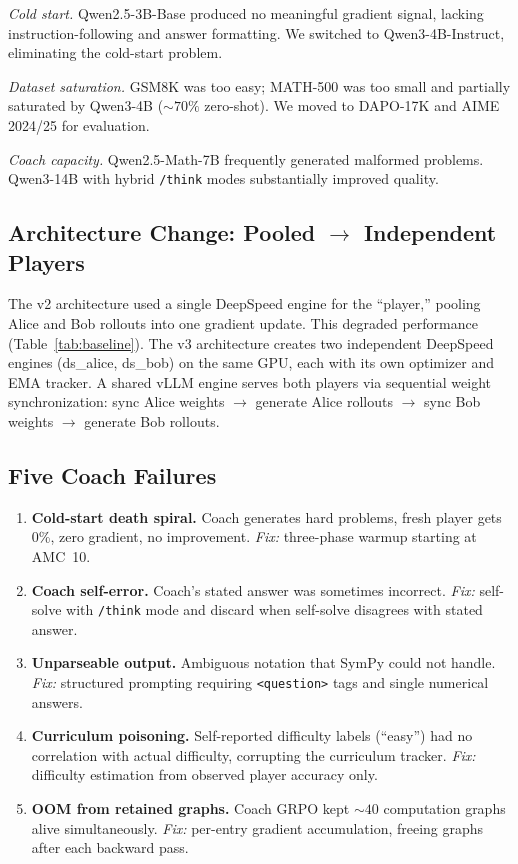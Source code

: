 \documentclass{article}
\begin{document}
\emph{Cold start.} Qwen2.5-3B-Base produced no meaningful gradient signal, lacking instruction-following and answer formatting. We switched to Qwen3-4B-Instruct, eliminating the cold-start problem.

\emph{Dataset saturation.} GSM8K was too easy; MATH-500 was too small and partially saturated by Qwen3-4B (${\sim}70\%$ zero-shot). We moved to DAPO-17K and AIME 2024/25 for evaluation.

\emph{Coach capacity.} Qwen2.5-Math-7B frequently generated malformed problems. Qwen3-14B with hybrid \texttt{/think} modes substantially improved quality.

\subsection{Architecture Change: Pooled $\rightarrow$ Independent Players}

The v2 architecture used a single DeepSpeed engine for the ``player,'' pooling Alice and Bob rollouts into one gradient update. This degraded performance (Table~\ref{tab:baseline}). The v3 architecture creates two independent DeepSpeed engines (ds\_alice, ds\_bob) on the same GPU, each with its own optimizer and EMA tracker. A shared vLLM engine serves both players via sequential weight synchronization: sync Alice weights $\rightarrow$ generate Alice rollouts $\rightarrow$ sync Bob weights $\rightarrow$ generate Bob rollouts.

\subsection{Five Coach Failures}

\begin{enumerate}[leftmargin=*,itemsep=1pt]
    \item \textbf{Cold-start death spiral.} Coach generates hard problems, fresh player gets 0\%, zero gradient, no improvement. \emph{Fix:} three-phase warmup starting at AMC~10.

    \item \textbf{Coach self-error.} Coach's stated answer was sometimes incorrect. \emph{Fix:} self-solve with \texttt{/think} mode and discard when self-solve disagrees with stated answer.

    \item \textbf{Unparseable output.} Ambiguous notation that SymPy could not handle. \emph{Fix:} structured prompting requiring \texttt{<question>} tags and single numerical answers.

    \item \textbf{Curriculum poisoning.} Self-reported difficulty labels (``easy'') had no correlation with actual difficulty, corrupting the curriculum tracker. \emph{Fix:} difficulty estimation from observed player accuracy only.

    \item \textbf{OOM from retained graphs.} Coach GRPO kept ${\sim}40$ computation graphs alive simultaneously. \emph{Fix:} per-entry gradient accumulation, freeing graphs after each backward pass.
\end{enumerate}
\end{document}
